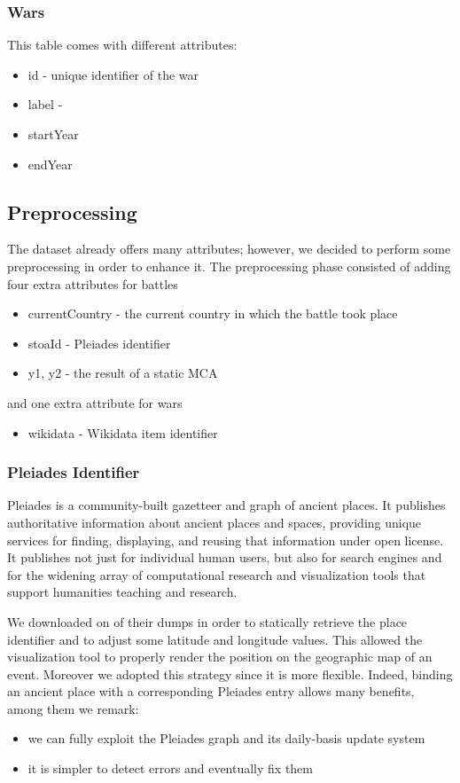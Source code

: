\subsubsection{Wars}
This table comes with different attributes:
\begin{itemize}
    \item id - unique identifier of the war
    \item label - 
    \item startYear
    \item endYear
\end{itemize}

\subsection{Preprocessing}
The dataset already offers many attributes; however, we decided to perform some preprocessing in order to enhance it. The preprocessing phase consisted of adding four extra attributes for battles
\begin{itemize}
    \item currentCountry - the current country in which the battle took place
    \item stoaId - Pleiades identifier
    \item y1, y2 - the result of a static MCA
\end{itemize}

and one extra attribute for wars
\begin{itemize}
    \item wikidata - Wikidata item identifier
\end{itemize}

\subsubsection{Pleiades Identifier}
Pleiades is a community-built gazetteer and graph of ancient places. It publishes authoritative information about ancient places and spaces, providing unique services for finding, displaying, and reusing that information under open license. It publishes not just for individual human users, but also for search engines and for the widening array of computational research and visualization tools that support humanities teaching and research.

We downloaded on of their dumps in order to statically retrieve the place identifier and to adjust some latitude and longitude values. This allowed the visualization tool to properly render the position on the geographic map of an event. Moreover we adopted this strategy since it is more flexible. Indeed, binding an ancient place with a corresponding Pleiades entry allows many benefits, among them we remark:
\begin{itemize}
    \item we can fully exploit the Pleiades graph and its daily-basis update system
    \item it is simpler to detect errors and eventually fix them
\end{itemize}


